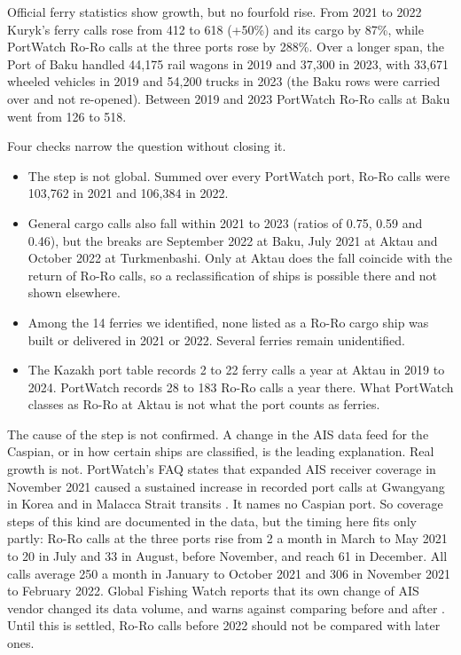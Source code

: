 \documentclass[11pt,a4paper]{article}
\begin{document}
Official ferry statistics show growth, but no fourfold rise. From 2021 to 2022 Kuryk's ferry calls rose from 412 to 618 (+50\%) and its cargo by 87\%, while PortWatch Ro-Ro calls at the three ports rose by 288\%. Over a longer span, the Port of Baku handled 44,175 rail wagons in 2019 and 37,300 in 2023, with 33,671 wheeled vehicles in 2019 and 54,200 trucks in 2023 (the Baku rows were carried over and not re-opened). Between 2019 and 2023 PortWatch Ro-Ro calls at Baku went from 126 to 518.

Four checks narrow the question without closing it.
\begin{itemize}
\item The step is not global. Summed over every PortWatch port, Ro-Ro calls were 103,762 in 2021 and 106,384 in 2022.
\item General cargo calls also fall within 2021 to 2023 (ratios of 0.75, 0.59 and 0.46), but the breaks are September 2022 at Baku, July 2021 at Aktau and October 2022 at Turkmenbashi. Only at Aktau does the fall coincide with the return of Ro-Ro calls, so a reclassification of ships is possible there and not shown elsewhere.
\item Among the 14 ferries we identified, none listed as a Ro-Ro cargo ship was built or delivered in 2021 or 2022. Several ferries remain unidentified.
\item The Kazakh port table records 2 to 22 ferry calls a year at Aktau in 2019 to 2024. PortWatch records 28 to 183 Ro-Ro calls a year there. What PortWatch classes as Ro-Ro at Aktau is not what the port counts as ferries.
\end{itemize}

The cause of the step is not confirmed. A change in the AIS data feed for the Caspian, or in how certain ships are classified, is the leading explanation. Real growth is not. PortWatch's FAQ states that expanded AIS receiver coverage in November 2021 caused a sustained increase in recorded port calls at Gwangyang in Korea and in Malacca Strait transits \cite{portwatch2026faq}. It names no Caspian port. So coverage steps of this kind are documented in the data, but the timing here fits only partly: Ro-Ro calls at the three ports rise from 2 a month in March to May 2021 to 20 in July and 33 in August, before November, and reach 61 in December. All calls average 250 a month in January to October 2021 and 306 in November 2021 to February 2022. Global Fishing Watch reports that its own change of AIS vendor changed its data volume, and warns against comparing before and after \cite{gfw2026vendor}. Until this is settled, Ro-Ro calls before 2022 should not be compared with later ones.
\end{document}
